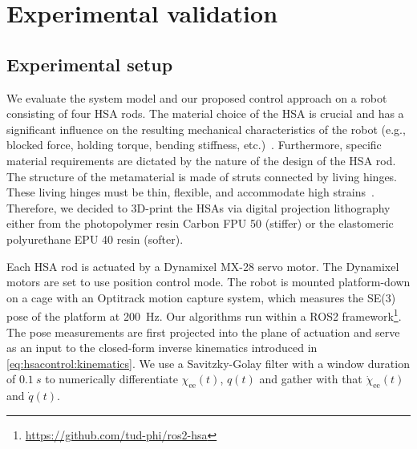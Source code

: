 \section{Experimental validation}

\subsection{Experimental setup}
We evaluate the system model and our proposed control approach on a robot consisting of four HSA rods.
The material choice of the \gls{HSA} is crucial and has a significant influence on the resulting mechanical characteristics of the robot  (e.g., blocked force, holding torque, bending stiffness, etc.)~\cite{truby2021recipe}. Furthermore, specific material requirements are dictated by the nature of the design of the \gls{HSA} rod. The structure of the metamaterial is made of struts connected by living hinges. These living hinges must be thin, flexible, and accommodate high strains~\cite{truby2021recipe}.
Therefore, we decided to 3D-print the \glspl{HSA} via digital projection lithography either from the photopolymer resin Carbon FPU 50 (stiffer) or the elastomeric polyurethane EPU 40 resin (softer).

Each \gls{HSA} rod is actuated by a Dynamixel MX-28 servo motor. The Dynamixel motors are set to use position control mode. %
The robot is mounted platform-down on a cage with an Optitrack motion capture system, which measures the SE(3) pose of the platform at \SI{200}{Hz}.
Our algorithms run within a ROS2 framework\footnote{\url{https://github.com/tud-phi/ros2-hsa}}. %
The pose measurements are first projected into the plane of actuation and serve as an input to the closed-form inverse kinematics introduced in \eqref{eq:hsacontrol:kinematics}. 
We use a Savitzky-Golay filter with a window duration of $\SI{0.1}{s}$ to numerically differentiate $\chi_\mathrm{ee}(t)$, $q(t)$ and gather with that $\dot{\chi}_\mathrm{ee}(t)$ and $\dot{q}(t)$.


